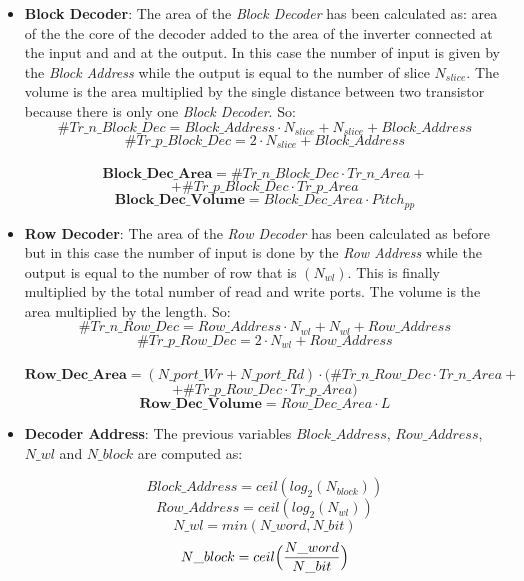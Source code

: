 \begin{itemize}
\item{\textbf{Block Decoder}}:
The area of the \textit{Block Decoder} has been calculated as: area of the the core of the decoder added to the area of the inverter connected at the input and and at the output. In this case the number of input is given by the \textit{Block Address} while the output is equal to the number of slice $N_{slice}$. The volume is the area multiplied by the single distance between two transistor because there is only one \textit{Block Decoder}. So:
	\[
	\#Tr\_n\_Block\_Dec = Block\_Address \cdot N_{slice} + N_{slice} + Block\_Address
	\]
	\[
	\#Tr\_p\_Block\_Dec = 2 \cdot N_{slice} + Block\_Address
	\]
	\\
	\[
	\textbf{Block\_Dec\_Area} = \#Tr\_n\_Block\_Dec \cdot Tr\_n\_Area +
	\]
	\[
	+ \#Tr\_p\_Block\_Dec \cdot Tr\_p\_Area
	\]
	\[
	\textbf{Block\_Dec\_Volume} = Block\_Dec\_Area \cdot Pitch_{pp}
	\]

\item{\textbf{Row Decoder}}:
The area of the \textit{Row Decoder} has been calculated as before but in this case the number of input is done by the \textit{Row Address} while the output is equal to the number of row that is $(N_{wl})$. This is finally multiplied by the total number of read and write ports. The volume is the area multiplied by the length. So:
	\[
	\#Tr\_n\_Row\_Dec = Row\_Address \cdot N_{wl} + N_{wl} + Row\_Address
	\]
	\[
	\#Tr\_p\_Row\_Dec = 2 \cdot N_{wl} + Row\_Address
	\]
	\\
	\[
	\textbf{Row\_Dec\_Area} = (N\_port\_Wr+N\_port\_Rd) \cdot (\#Tr\_n\_Row\_Dec \cdot Tr\_n\_Area +
	\]
	\[
	+ \#Tr\_p\_Row\_Dec \cdot Tr\_p\_Area)
	\]
	\[
	\textbf{Row\_Dec\_Volume} = Row\_Dec\_Area \cdot L
	\]
\newpage

\item{\textbf{Decoder Address}}:
The previous variables $Block\_Address$, $Row\_Address$,\\ $N\_wl$ and $N\_block$ are computed as:

	\[
	Block\_Address = ceil(log_{2}(N_{block}))
	\]
	\[
	Row\_Address = ceil(log_{2}(N_{wl}))
	\]
	\[
	N\_wl=min(N\_word,N\_bit)
	\]
	\[
	N\_block = ceil \Bigl ( \frac{N\_word} {N\_bit}\Bigl )
	\]

\end{itemize}
